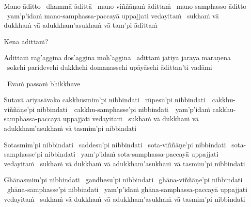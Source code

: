 \ifbfive\clearpage\fi

\begin{pali-hang}
  Mano āditto \breathmark\ dhammā ādittā \breathmark\ mano-viññāṇaṁ ādittaṁ \breathmark\ mano-samphasso āditto \breathmark\ yam'p'idaṁ mano-samphassa-paccayā uppajjati vedayitaṁ \breathmark\ sukhaṁ vā dukkhaṁ vā adukkham'asukhaṁ vā tam'pi ādittaṁ
\end{pali-hang}
\begin{pali-hang-together}
  Kena ādittaṁ?
\end{pali-hang-together}
\begin{pali-hang-together}
  Ādittaṁ rāg'agginā dos'agginā moh'agginā \breathmark\ ādittaṁ jātiyā jarāya maraṇena \breathmark\ sokehi paridevehi dukkhehi domanassehi upāyāsehi ādittan'ti vadāmi
\end{pali-hang-together}

\ifninebythirteen\clearpage\fi

\begin{leader-pali}
  \anglebracketleft\ \hspace{-0.5mm}Evaṁ passaṁ bhikkhave \hspace{-0.5mm}\anglebracketright\
\end{leader-pali}
\begin{pali-hang-together}
  Sutavā ariyasāvako cakkhusmim'pi nibbindati \breathmark\ rūpesu'pi nibbindati~\breathmark\ cakkhu-viññāṇe'pi \mbox{nibbindati}~\breathmark\ cakkhu-samphasse'pi nibbindati~\breathmark\ yam'p'idaṁ cakkhu-samphassa-paccayā uppajjati vedayitaṁ \breathmark\ sukhaṁ vā dukkhaṁ vā adukkham'asukhaṁ vā tasmim'pi nibbindati
\end{pali-hang-together}

\begin{pali-hang}
  Sotasmim'pi nibbindati \breathmark\ saddesu'pi nibbindati \breathmark\ sota-viññāṇe'pi nibbindati \breathmark\ sota-samphasse'pi nibbindati \breathmark\ yam'p'idaṁ sota-samphassa-paccayā uppajjati vedayitaṁ \breathmark\ sukhaṁ vā dukkhaṁ vā adukkham'asukhaṁ vā tasmim'pi nibbindati
\end{pali-hang}

\begin{pali-hang}
  Ghānasmim'pi nibbindati \breathmark\ gandhesu'pi nibbindati \breathmark\ ghāna-viññāṇe'pi nibbindati \breathmark\ ghāna-samphasse'pi nibbindati \breathmark\ yam'p'idaṁ ghāna-samphassa-paccayā uppajjati vedayitaṁ \breathmark\ sukhaṁ vā dukkhaṁ vā adukkham'asukhaṁ vā tasmim'pi nibbindati
\end{pali-hang}

